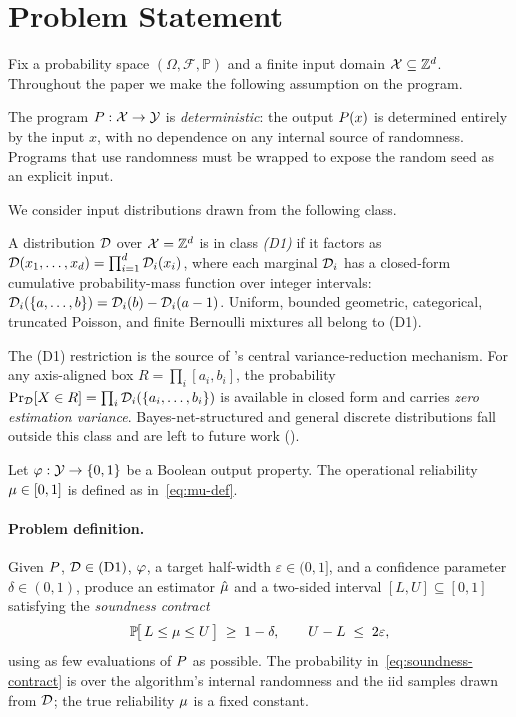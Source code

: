 \section{Problem Statement}\label{sec:problem}

Fix a probability space $(\Omega, \mathcal{F}, \mathbb{P})$ and a
finite input domain $\mathcal{X} \subseteq \mathbb{Z}^d$.  Throughout the
paper we make the following assumption on the program.

\begin{assumption*}\label{ass:program}
  The program $P : \mathcal{X} \to \mathcal{Y}$ is \emph{deterministic}: the
  output $P(x)$ is determined entirely by the input $x$, with no
  dependence on any internal source of randomness.  Programs that use
  randomness must be wrapped to expose the random seed as an explicit
  input.
\end{assumption*}

We consider input distributions drawn from the following class.

\begin{definition}%
  \label{def:d1}
  A distribution $\mathcal{D}$ over $\mathcal{X} = \mathbb{Z}^d$ is in class
  \emph{(D1)} if it factors as
  $\mathcal{D}(x_1, \ldots, x_d) = \prod_{i=1}^d \mathcal{D}_i(x_i)$,
  where each marginal $\mathcal{D}_i$ has a closed-form cumulative
  probability-mass function over integer intervals:
  $\mathcal{D}_i(\{a, \ldots, b\}) = \mathcal{D}_i(b) - \mathcal{D}_i(a-1)$.
  Uniform, bounded geometric, categorical, truncated Poisson, and
  finite Bernoulli mixtures all belong to (D1).
\end{definition}

The (D1) restriction is the source of \toolname{}'s central
variance-reduction mechanism.  For any axis-aligned box
$R = \prod_i [a_i, b_i]$, the probability
$\Pr_{\mathcal{D}}[X \in R] = \prod_i \mathcal{D}_i(\{a_i, \ldots, b_i\})$ is
available in closed form and carries \emph{zero estimation variance}.
Bayes-net-structured and general discrete distributions fall outside
this class and are left to future work ().

Let $\varphi : \mathcal{Y} \to \{0,1\}$ be a Boolean output property.  The
operational reliability $\mu \in [0,1]$ is defined as
in~\eqref{eq:mu-def}.

\paragraph{Problem definition.}
Given $P$, $\mathcal{D} \in \text{(D1)}$, $\varphi$, a target half-width
$\varepsilon \in (0,1]$, and a confidence parameter $\delta \in (0,1)$,
produce an estimator $\hat{\mu}$ and a two-sided interval
$[L,U] \subseteq [0,1]$ satisfying the \emph{soundness contract}
\begin{equation}\label{eq:soundness-contract}
  \mathbb{P}\!\big[\,L \le \mu \le U\,\big] \;\ge\; 1 - \delta,
  \qquad
  U - L \;\le\; 2\varepsilon,
\end{equation}
using as few evaluations of $P$ as possible.  The probability
in~\eqref{eq:soundness-contract} is over the algorithm's internal
randomness and the iid samples drawn from $\mathcal{D}$; the true
reliability $\mu$ is a fixed constant.

